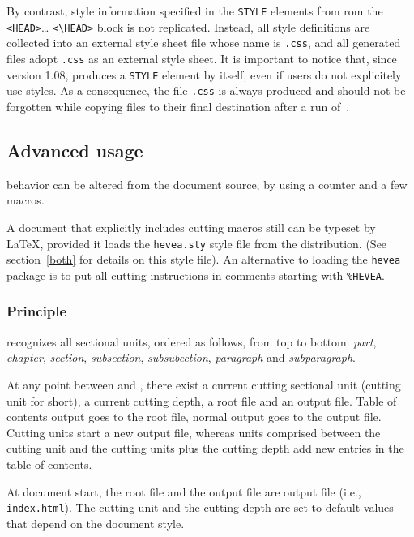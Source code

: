 \label{hacha:style}%
By contrast, style information specified in the \verb+STYLE+ elements
from rom the \verb+<HEAD>+\ldots{} \verb+<\HEAD>+
block is not replicated. Instead, all style definitions are collected into an
external style sheet file whose name is \texttt{.css},
and all generated {\html} files adopt \texttt{.css} as
an external style sheet.
It is important to notice that, since version 1.08, \hevea{} produces
a \verb+STYLE+ element by itself, even if users do not explicitely
use styles. As a consequence, the file \texttt{.css} is
always produced and should not be forgotten while
copying files to their final destination after a run of~\hacha.

\subsection{Advanced usage}

\hacha{} behavior can be altered from the document source, by using
a counter and a few macros.

A document that explicitly includes cutting macros still can be typeset by
\LaTeX{}, provided it loads the
\texttt{hevea.sty} style file from the \hevea{} distribution.
(See section~\ref{both} for details on this style file).
An alternative to loading the \texttt{hevea} package is to put
all cutting instructions in comments starting with \verb+%HEVEA+.



\subsubsection{Principle}
{\hacha} recognizes all sectional units, ordered as follows, from
top to bottom: {\em
part}, {\em chapter},
{\em section}, {\em subsection}, {\em subsubection},
\emph{paragraph} and \emph{subparagraph}.

At any point between \verb++ and
\verb++,
there exist a current cutting sectional unit (cutting unit for short),
a current cutting depth, a root file and an output file.
Table of contents output goes to the root file, normal output goes to
the output file.
Cutting units start a new output file, whereas units comprised between the
cutting unit and the cutting units plus the cutting depth add new
entries in the table of contents.

At document start, the root file and the output file are {\hacha}
output file (i.e., \texttt{index.html}).
The cutting unit and the cutting depth are set to default values that
depend on the document style.

